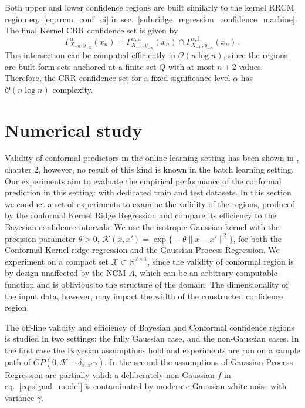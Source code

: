 \documentclass[conference]{IEEEtran}
\newcommand{\Kcal}{\mathcal{K}}
\newcommand{\BigO}{\mathcal{O}}
\newcommand{\Xcal}{\mathcal{X}}
\newcommand{\Real}{\mathbb{R}}
\begin{document}
Both upper and lower confidence regions are built similarly to the kernel RRCM region
eq.~\ref{eq:rrcm_conf_ci} in sec.~\ref{sub:ridge_regression_confidence_machine}. The
final Kernel CRR confidence set is given by
\begin{equation} \label{eq:crr_conf_ci}
  \Gamma_{X_{-n}, y_{-n}}^\alpha(x_n)
    = \Gamma_{X_{-n}, y_{-n}}^{\alpha,\text{u}}(x_n)
    \cap \Gamma_{X_{-n}, y_{-n}}^{\alpha,\text{l}}(x_n)
    \,.
\end{equation}
This intersection can be computed efficiently in $\BigO(n \log{} n)$, since the regions
are built form sets anchored at a finite set $Q$ with at most $n+2$ values. Therefore,
the CRR confidence set for a fixed significance level $\alpha$ has $\BigO(n\log{} n)$
complexity.



\section{Numerical study} %
\label{sec:numerical_study}

Validity of conformal predictors in the online learning setting has been shown in
\cite{vovk2005}, chapter 2, however, no result of this kind is known in the batch
learning setting. Our experiments aim to evaluate the empirical performance of the
conformal prediction in this setting: with dedicated train and test datasets. In
this section we conduct a set of experiments to examine the validity of the regions,
produced by the conformal Kernel Ridge Regression and compare its efficiency to
the Bayesian confidence intervals. We use the isotropic Gaussian kernel with the
precision parameter $\theta>0$, $\Kcal(x,x') = \mathop{\text{exp}}\bigl
\{-\theta \|x - x'\|^2\bigr\}$, for both the Conformal Kernel ridge regression and
the Gaussian Process Regression. We experiment on a compact set $\Xcal\subset \Real^{d\times 1}$,
since the validity of conformal region is by design unaffected by the NCM $A$, which
can be an arbitrary computable function and is oblivious to the structure of the
domain. The dimensionality of the input data, however, may impact the width of
the constructed confidence region.

The off-line validity and efficiency of Bayesian and Conformal confidence regions
is studied in two settings: the fully Gaussian case, and the non-Gaussian cases.
In the first case the Bayesian assumptions hold and experiments are run on a sample
path of $GP(0, \Kcal + \delta_{x,x'} \gamma)$. In the second the assumptions of
Gaussian Process Regression are partially valid: a deliberately non-Gaussian $f$
in eq.~\ref{eq:signal_model} is contaminated by moderate Gaussian white noise with
variance $\gamma$.
\end{document}
